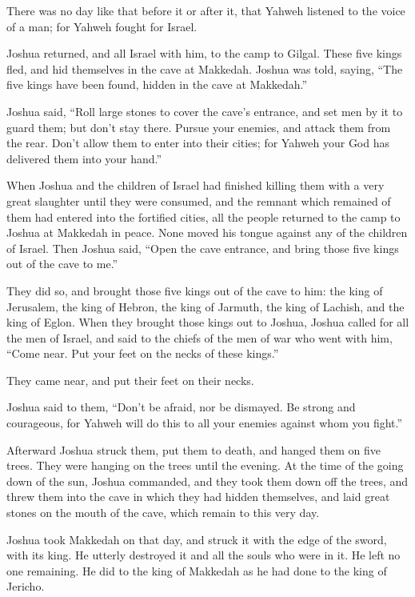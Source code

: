 {There was no day like that before it or after it, that Yahweh listened to the voice of a man; for Yahweh fought for Israel.
\par }{\PP {}Joshua returned, and all Israel with him, to the camp to Gilgal.
These five kings fled, and hid themselves in the cave at Makkedah.
Joshua was told, saying, “The five kings have been found, hidden in the cave at Makkedah.”
\par }{\PP {}Joshua said, “Roll large stones to cover the cave’s entrance, and set men by it to guard them;
but don’t stay there. Pursue your enemies, and attack them from the rear. Don’t allow them to enter into their cities; for Yahweh your God has delivered them into your hand.”
\par }{\PP {}When Joshua and the children of Israel had finished killing them with a very great slaughter until they were consumed, and the remnant which remained of them had entered into the fortified cities,
all the people returned to the camp to Joshua at Makkedah in peace. None moved his tongue against any of the children of Israel.
Then Joshua said, “Open the cave entrance, and bring those five kings out of the cave to me.”
\par }{\PP {}They did so, and brought those five kings out of the cave to him: the king of Jerusalem, the king of Hebron, the king of Jarmuth, the king of Lachish, and the king of Eglon.
When they brought those kings out to Joshua, Joshua called for all the men of Israel, and said to the chiefs of the men of war who went with him, “Come near. Put your feet on the necks of these kings.”
\par }{\PP They came near, and put their feet on their necks.
\par }{\PP {}Joshua said to them, “Don’t be afraid, nor be dismayed. Be strong and courageous, for Yahweh will do this to all your enemies against whom you fight.”
\par }{\PP {}Afterward Joshua struck them, put them to death, and hanged them on five trees. They were hanging on the trees until the evening.
At the time of the going down of the sun, Joshua commanded, and they took them down off the trees, and threw them into the cave in which they had hidden themselves, and laid great stones on the mouth of the cave, which remain to this very day.
\par }{\PP {}Joshua took Makkedah on that day, and struck it with the edge of the sword, with its king. He utterly destroyed it and all the souls who were in it. He left no one remaining. He did to the king of Makkedah as he had done to the king of Jericho.
}
